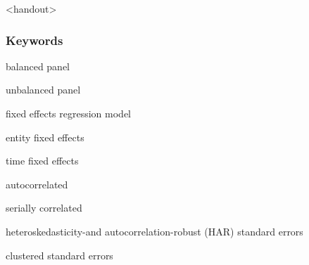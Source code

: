 

\begin{frame}<handout>
\frametitle{Keywords}
\begin{iteminline}
\item balanced panel
\item unbalanced panel
\item fixed effects regression model
\item entity fixed effects
\item time fixed effects
\item autocorrelated
\item serially correlated
\item heteroskedasticity-and autocorrelation-robust (HAR) standard errors 
\item clustered standard errors
\end{iteminline}
\end{frame}



